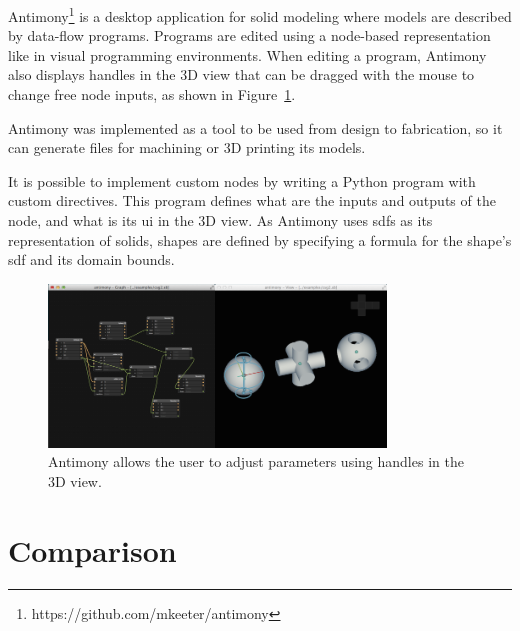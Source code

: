 Antimony\footnote{https://github.com/mkeeter/antimony} is a desktop application for solid modeling where models are described by data-flow programs.
Programs are edited using a node-based representation like in visual programming environments.
When editing a program, Antimony also displays handles in the 3D view that can be dragged with the mouse to change free node inputs, as shown in Figure~\ref{fig:antimony:handles}.

Antimony was implemented as a tool to be used from design to fabrication, so it can generate files for machining or 3D printing its models.

It is possible to implement custom nodes by writing a Python program with custom directives.
This program defines what are the inputs and outputs of the node, and what is its \gls{ui} in the 3D view.
As Antimony uses \glspl{sdf} as its representation of solids, shapes are defined by specifying a formula for the shape's \gls{sdf} and its domain bounds.

\begin{figure}
	\centering
	\includegraphics[width=0.8\textwidth]{images/antimony_ui_handles}
	\caption{Antimony allows the user to adjust parameters using handles in the 3D view.}
	\label{fig:antimony:handles}
\end{figure}


\section{Comparison}


